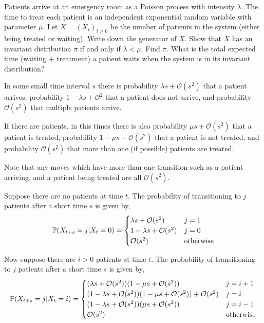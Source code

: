\pagebreak
\begin{problem}[Exercise 5.1]
Patients arrive at an emergency room as a Poisson process with intensity \( \lambda \). The time to treat each patient is an independent exponential random variable with parameter \( \mu \). Let \( X= (X_t)_{t\geq 0} \) be the number of patients in the system (either being treated or waiting). Write down the generator of \( X \). Show that \( X \) has an invariant distribution \( \pi \) if and only if \( \lambda<\mu \). Find \( \pi \). What is the total expected time (waiting + treatment) a patient waits when the system is in its invariant distribution?
\end{problem}

\begin{solution}[Solution]
In some small time interval \( s \) there is probability \( \lambda s + \mathcal{O}(s^2) \) that a patient arrives, probability \( 1-\lambda s + \mathcal{O}^2 \) that a patient does not arrive, and probability \( \mathcal{O}(s^2) \) that multiple patients arrive.

If there are patients, in this times there is also probability \( \mu s + \mathcal{O}(s^2) \) that a patient is treated, probability \( 1- \mu s + \mathcal{O}(s^2) \) that a patient is not treated, and probability \( \mathcal{O}(s^2) \) that more than one (if possible) patients are treated.

Note that any moves which have more than one transition such as a patient arriving, and a patient being treated are all \( \mathcal{O}(s^2) \).

Suppose there are no patients at time \( t \). The probability of transitioning to \( j \) patients after a short time \( s \) is given by,
\begin{align*}
    \mathbb{P}(X_{t+s} = j | X_{t} = 0) = 
    \begin{cases}
        \lambda s + \mathcal{O}(s^2) & j=1 \\
        1-\lambda s + \mathcal{O}(s^2) & j=0 \\
        \mathcal{O}(s^2) & \text{otherwise}
    \end{cases}
\end{align*}

Now suppose there are \( i>0 \) patients at time \( t \). The probability of transitioning to \( j \) patients after a short time \( s \) is given by,
\begin{align*}
    \mathbb{P}(X_{t+s} = j | X_{t} = i) = 
    \begin{cases}
        (\lambda s + \mathcal{O}(s^2))(1-\mu s + \mathcal{O}(s^2)) & j=i+1 \\
        (1-\lambda s + \mathcal{O}(s^2))(1-\mu s + \mathcal{O}(s^2)) + \mathcal{O}(s^2) & j=i \\
        (1-\lambda s + \mathcal{O}(s^2))(\mu s + \mathcal{O}(s^2)) & j=i-1 \\
        \mathcal{O}(s^2) & \text{otherwise}
    \end{cases}
\end{align*}


\end{solution}
